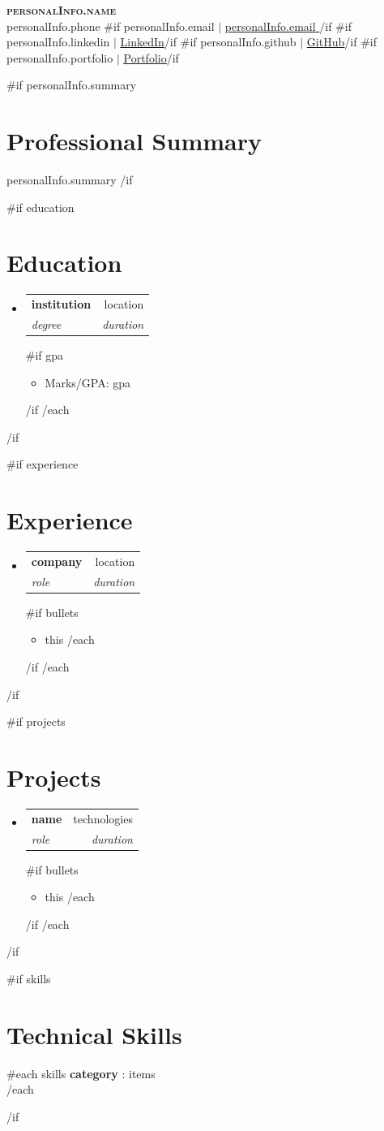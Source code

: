 \documentclass[letterpaper,11pt]{article}
\makeatletter
\newcommand{\resumeItem}[1]{\item\small{#1 \vspace{-2pt}}}
\newcommand{\resumeSubheading}[4]{
  \vspace{-2pt}\item
    \begin{tabular*}{0.97\textwidth}[t]{l@{\extracolsep{\fill}}r}
      \textbf{#1} & #2 \\
      \textit{\small#3} & \textit{\small #4} \\
    \end{tabular*}\vspace{-7pt}
}
\newcommand{\resumeSubHeadingListStart}{\begin{itemize}[leftmargin=0.15in, label={}]}
\newcommand{\resumeSubHeadingListEnd}{\end{itemize}}
\newcommand{\resumeItemListStart}{\begin{itemize}}
\newcommand{\resumeItemListEnd}{\end{itemize}\vspace{-5pt}}
\makeatother
\begin{document}
\begin{center}
    \textbf{\Huge \scshape {{{personalInfo.name}}} } \\ \vspace{1pt}
    \small {{{personalInfo.phone}}} {{#if personalInfo.email}} $|$ \href{mailto:{{{personalInfo.email}}} }{\underline{ {{{personalInfo.email}}} }}{{/if}} 
    {{#if personalInfo.linkedin}} $|$ \href{ {{{personalInfo.linkedin}}} }{\underline{LinkedIn}}{{/if}} 
    {{#if personalInfo.github}} $|$ \href{ {{{personalInfo.github}}} }{\underline{GitHub}}{{/if}} 
    {{#if personalInfo.portfolio}} $|$ \href{ {{{personalInfo.portfolio}}} }{\underline{Portfolio}}{{/if}}
\end{center}

{{#if personalInfo.summary}}
\section{Professional Summary}
\vspace{2pt}
\small{ {{{personalInfo.summary}}} }
\vspace{4pt}
{{/if}}

{{#if education}}
\section{Education}
  \resumeSubHeadingListStart
{{#each education}}
    \resumeSubheading
      { {{{institution}}} }{ {{{location}}} }
      { {{{degree}}} }{ {{{duration}}} }
{{#if gpa}}
      \resumeItemListStart
        \resumeItem{Marks/GPA: {{gpa}} }
      \resumeItemListEnd
{{/if}}
{{/each}}
  \resumeSubHeadingListEnd
{{/if}}

{{#if experience}}
\section{Experience}
  \resumeSubHeadingListStart
{{#each experience}}
    \resumeSubheading
      { {{{company}}} }{ {{{location}}} }
      { {{{role}}} }{ {{{duration}}} }
{{#if bullets}}
      \resumeItemListStart
{{#each bullets}}
        \resumeItem{ {{{this}}} }
{{/each}}
      \resumeItemListEnd
{{/if}}
{{/each}}
  \resumeSubHeadingListEnd
{{/if}}

{{#if projects}}
\section{Projects}
  \resumeSubHeadingListStart
{{#each projects}}
    \resumeSubheading
      { {{{name}}} }{ {{{technologies}}} }
      { {{{role}}} }{ {{{duration}}} }
{{#if bullets}}
      \resumeItemListStart
{{#each bullets}}
        \resumeItem{ {{{this}}} }
{{/each}}
      \resumeItemListEnd
{{/if}}
{{/each}}
  \resumeSubHeadingListEnd
{{/if}}

{{#if skills}}
\section{Technical Skills}
 \begin{itemize}[leftmargin=0.15in, label={}]
    \small{\item{
{{#each skills}}
     \textbf{ {{{category}}} }{: {{{items}}} } \\
{{/each}}
    }}
 \end{itemize}
{{/if}}
\end{document}

